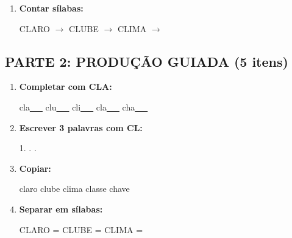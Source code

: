 \begin{exercicio}
\begin{enumerate}
  \item \textbf{Contar sílabas:}
  \begin{center}
  CLARO $\rightarrow$ \underline{\hspace{0.9cm}} \quad CLUBE $\rightarrow$ \underline{\hspace{0.9cm}} \quad CLIMA $\rightarrow$ \underline{\hspace{0.9cm}}
  \end{center}

\end{enumerate}

\subsection*{PARTE 2: PRODUÇÃO GUIADA (5 itens)}

\begin{enumerate}[resume]

  \item \textbf{Completar com CLA:}
  \begin{center}
  cla\underline{~~~} \quad clu\underline{~~~} \quad cli\underline{~~~} \quad cla\underline{~~~} \quad cha\underline{~~~}
  \end{center}

  \item \textbf{Escrever 3 palavras com CL:}
  \begin{center}
  1. \underline{\hspace{3cm}} . \underline{\hspace{3cm}} . \underline{\hspace{3cm}}
  \end{center}

  \item \textbf{Copiar:}
  \begin{center}
  claro \quad clube \quad clima \quad classe \quad chave
  \end{center}

  \item \textbf{Separar em sílabas:}
  \begin{center}
  CLARO = \underline{\hspace{1cm}} \underline{\hspace{1cm}} \quad CLUBE = \underline{\hspace{1cm}} \underline{\hspace{1cm}} \quad CLIMA = \underline{\hspace{1cm}} \underline{\hspace{1cm}}
  \end{center}


\end{enumerate}
\end{exercicio}
